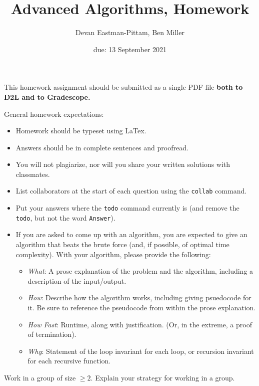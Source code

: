\documentclass{article}
\title{Advanced Algorithms, Homework \hwnum}
\author{Devan Eastman-Pittam, Ben Miller}
\date{due: 13 September 2021}
\begin{document}
\maketitle

This homework assignment should be
submitted as a single PDF file {\bf both to D2L and to Gradescope.}

General homework expectations:
\begin{itemize}
	\item Homework should be typeset using LaTex.
	\item Answers should be in complete sentences and proofread.
	\item You will not plagiarize, nor will you share your written solutions
	      with classmates.
	\item List collaborators at the start of each question using the
	      \texttt{collab} command.
	\item Put your answers where the \texttt{todo} command currently is (and
	      remove the \texttt{todo}, but not the word \texttt{Answer}).
	\item If you are asked to come up with an algorithm, you are
	      expected to give an algorithm that beats the brute force (and, if possible, of
	      optimal time complexity). With your algorithm, please provide the following:
	      \begin{itemize}
		      \item \emph{What}: A prose explanation of the problem and the algorithm,
		            including a description of the input/output.
		      \item \emph{How}: Describe how the algorithm works, including giving
		            psuedocode for it.  Be sure to reference the pseudocode
		            from within the prose explanation.
		      \item \emph{How Fast}: Runtime, along with justification.  (Or, in the
		            extreme, a proof of termination).
		      \item \emph{Why}: Statement of the loop invariant for each loop, or
		            recursion invariant for each recursive function.
	      \end{itemize}
\end{itemize}




Work in a group of size $\geq 2$.  Explain your strategy for working in a group.
\end{document}
